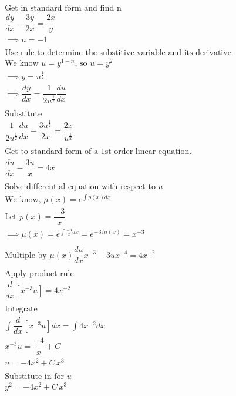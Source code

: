 \documentclass{article}
\begin{document}
\begin{gather*}
\text{Get in standard form and find n}\\
\dfrac{dy}{dx}-\dfrac{3y}{2x}=\dfrac{2x}{y}\\
\implies n = -1\\\\
\text{Use rule to determine the substitive variable and its derivative}\\
\text{We know }u=y^{1-n}\text{, so } u=y^2\\
\implies y=u^{\frac{1}{2}}\\
\implies \dfrac{dy}{dx}=\dfrac{1}{2u^{\frac{1}{2}}}\dfrac{du}{dx}\\\\
\text{Substitute}\\
\dfrac{1}{2u^{\frac{1}{2}}}\dfrac{du}{dx}-\dfrac{3u^{\frac{1}{2}}}{2x}=\dfrac{2x}{u^{\frac{1}{2}}}\\\\
\text{Get to standard form of a 1st order linear equation.}\\
\dfrac{du}{dx}-\dfrac{3u}{x}=4x\\\\
\text{Solve differential equation with respect to }u\\
\text{We know, }\mu(x)=e^{\int p(x)dx}\\
\text{Let }p(x)=\dfrac{-3}{x}\\
\implies\mu(x)=e^{\int \frac{-3}{x}dx}=e^{-3\,ln(x)}=x^{-3}\\\\
\text{Multiple by }\mu(x)
\dfrac{du}{dx}x^{-3}-3ux^{-4}=4x^{-2}\\\\
\text{Apply product rule}\\
\dfrac{d}{dx}[x^{-3}u]=4x^{-2}\\\\
\text{Integrate}\\
\int\dfrac{d}{dx}[x^{-3}u]dx=\int 4x^{-2}dx\\
x^{-3}u=\dfrac{-4}{x}+C\\
u=-4x^2+C\,x^3\\\\
\text{Substitute in for }u\\
y^2=-4x^2+C\,x^3
\end{gather*}
\end{document}
